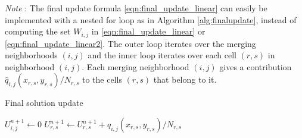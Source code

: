 \noindent\textit{Note }: The final update formula \eqref{eqn:final_update_linear} can easily be implemented with a 
nested for loop as in Algorithm \ref{alg:finalupdate},  
instead of computing the set $W_{i,j}$ in \eqref{eqn:final_update_linear} or \eqref{eqn:final_update_linear2}.  
The outer loop iterates over the merging neighborhoods $(i,j)$ and the inner loop iterates over each cell $(r,s)$ in neighborhood $(i,j)$.  Each merging neighborhood $(i,j)$ gives a contribution $ \hat{q}_{i,j}(x_{r,s}, y_{r,s})/N_{r,s} $ to the cells $(r,s)$ that belong to it. 
\begin{algorithm}[H]
		\caption{\sf Final solution update} \label{alg:finalupdate}
	\begin{algorithmic}
	\State $U^{n+1}_{i,j} \leftarrow 0$
	\EndFor
			\State $U^{n+1}_{r,s} \leftarrow U^{n+1}_{r,s} + \hat{q}_{i,j}(x_{r,s}, y_{r,s})/N_{r,s} $
		\EndFor
	\EndFor
	\end{algorithmic}
\end{algorithm}




